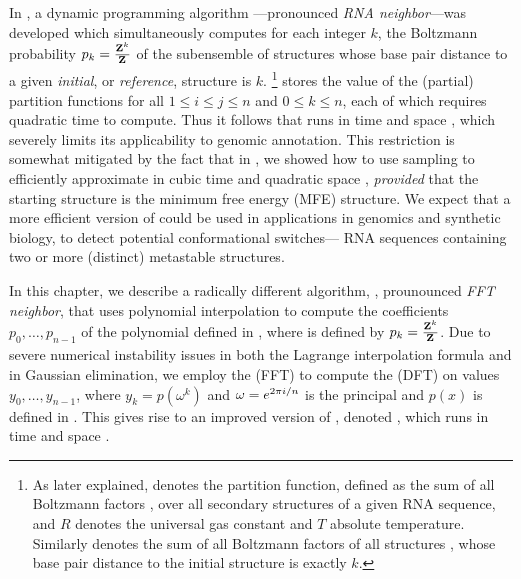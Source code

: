 In \citep{freyhult.b07}, a dynamic programming algorithm
\rnabor---pronounced {\em RNA neighbor}---was developed which simultaneously
computes for
each integer $k$, the Boltzmann probability $p_k = \frac{{\bf Z}^{k}_{}}{{\bf Z}^{}_{}}$
of the subensemble of structures
whose base pair distance to a given {\em initial}, or
{\em reference}, structure \strSt is $k$.
\footnote{As later
explained, \fullZ denotes the partition function, defined as the sum of
all Boltzmann factors \boltzf{\str}, over all secondary structures \str
of a given RNA sequence, and $R$ denotes the universal
gas constant and $T$ absolute temperature. Similarly  denotes the
sum of all Boltzmann factors of all structures \str, whose base pair distance
to the initial structure \strSt is exactly $k$.}
\rnabor stores the value of the (partial)
partition functions  for all $1 \leq i \leq j \leq n$ and
$0 \leq k \leq n$, each of which requires quadratic time to compute.
Thus it follows that \rnabor runs in time  and space
, which severely limits its applicability to genomic annotation.
This restriction is somewhat mitigated by the fact that
in \citep{cloteloulorenz}, we showed how to use sampling
\citep{ding.nar03} to efficiently approximate
\rnabor in cubic time  and quadratic space ,
{\em provided} that the starting structure \strSt is the minimum free
energy (MFE) structure. We expect that a more efficient version of
\rnabor could be used in applications in genomics and synthetic
biology, to detect potential conformational switches---
RNA sequences containing two or more (distinct) metastable structures.

In this chapter, we describe a radically different algorithm, \fftbor,
prounounced {\em FFT neighbor},
that uses polynomial interpolation to compute the
coefficients $p_0,\ldots,p_{n-1}$ of the polynomial defined in
,
where \pk is defined by $p_k = \frac{{\bf Z}^{k}_{}}{{\bf Z}^{}_{}}$.
Due to severe numerical instability issues in both the Lagrange
interpolation formula and in Gaussian elimination, we employ
the \fft (FFT) to compute the \idft (DFT) on values $y_0,\ldots,y_{n-1}$,
where $y_k = p(\omega^k)$ and
$\omega = e^{2 \pi i/n}$ is the principal \nRoU and
$p(x)$ is defined in . This
gives rise to an improved version of \rnabor, denoted \fftbor,
which runs in time  and space .

